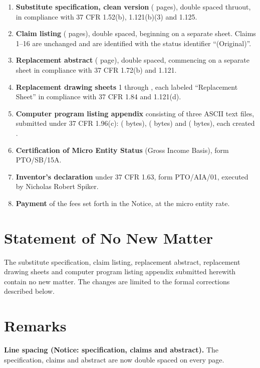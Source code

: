 \documentclass[12pt,letter]{article}
\begin{document}
\begin{enumerate}[leftmargin=*]
    \item \textbf{Substitute specification, clean version} (\specPages{} pages), double spaced thruout, in compliance with 37 CFR 1.52(b), 1.121(b)(3) and 1.125.
    \item \textbf{Claim listing} (\claimsPages{} pages), double spaced, beginning on a separate sheet. Claims 1--16 are unchanged and are identified with the status identifier ``(Original)''.
    \item \textbf{Replacement abstract} (\abstractPages{} page), double spaced, commencing on a separate sheet in compliance with 37 CFR 1.72(b) and 1.121.
    \item \textbf{Replacement drawing sheets} 1 through \drawingSheets{}, each labeled ``Replacement Sheet'' in compliance with 37 CFR 1.84 and 1.121(d).
    \item \textbf{Computer program listing appendix} consisting of three ASCII text files, submitted under 37 CFR 1.96(c): \texttt{\cplaHardfloatName} (\cplaHardfloatBytes{} bytes), \texttt{\cplaScalarName} (\cplaScalarBytes{} bytes) and \texttt{\cplaCircleName} (\cplaCircleBytes{} bytes), each created \cplaDate.
    \item \textbf{Certification of Micro Entity Status} (Gross Income Basis), form PTO/SB/15A.
    \item \textbf{Inventor's declaration} under 37 CFR 1.63, form PTO/AIA/01, executed by Nicholas Robert Spiker.
    \item \textbf{Payment} of the fees set forth in the Notice, at the micro entity rate.
\end{enumerate}

\section*{Statement of No New Matter}

The substitute specification, claim listing, replacement abstract, replacement drawing sheets and computer program listing appendix submitted herewith contain no new matter. The changes are limited to the formal corrections described below.

\section*{Remarks}

\textbf{Line spacing (Notice: specification, claims and abstract).} The specification, claims and abstract are now double spaced on every page.
\end{document}
